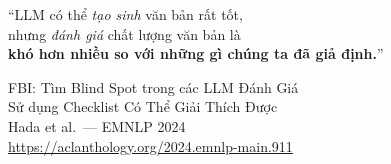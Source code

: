 \documentclass[aspectratio=169,10pt]{beamer}
\newcommand{\fbi}{\textsc{FBI}}
\begin{document}
{
\begin{frame}
  \centering
  \vspace{1em}
  \Large
  ``LLM có thể \emph{tạo sinh} văn bản rất tốt,\\
  nhưng \emph{đánh giá} chất lượng văn bản là\\
  \textbf{khó hơn nhiều so với những gì chúng ta đã giả định.}''

  \vspace{1.5em}
  \normalsize
  \fbi{}: Tìm Blind Spot trong các LLM Đánh Giá\\
  Sử dụng Checklist Có Thể Giải Thích Được\\[0.5em]
  \small Hada et al.\ — EMNLP 2024\\
  \url{https://aclanthology.org/2024.emnlp-main.911}
\end{frame}
}

\end{document}
